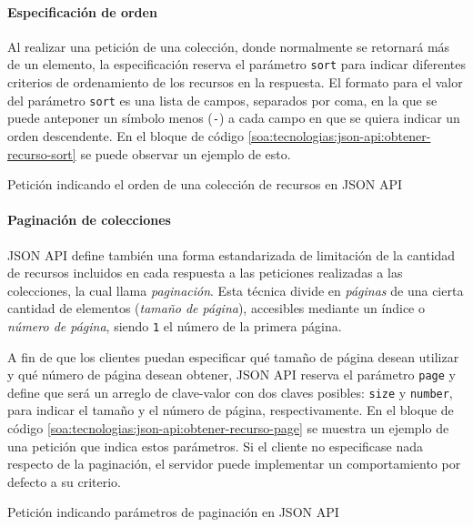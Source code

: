 \paragraph{Especificación de orden}

Al realizar una petición de una colección, donde normalmente se retornará más de un elemento, la especificación reserva el parámetro \texttt{sort} para indicar diferentes criterios de ordenamiento de los recursos en la respuesta. El formato para el valor del parámetro \texttt{sort} es una lista de campos, separados por coma, en la que se puede anteponer un símbolo menos (\texttt{-}) a cada campo en que se quiera indicar un orden descendente. En el bloque de código \autoref{soa:tecnologias:json-api:obtener-recurso-sort} se puede observar un ejemplo de esto.

\begin{listing}
  \caption{Petición indicando el orden de una colección de recursos en JSON API}
  \label{soa:tecnologias:json-api:obtener-recurso-sort}
\end{listing}

\paragraph{Paginación de colecciones}

JSON API define también una forma estandarizada de limitación de la cantidad de recursos incluidos en cada respuesta a las peticiones realizadas a las colecciones, la cual llama \textit{paginación}. Esta técnica divide en \textit{páginas} de una cierta cantidad de elementos (\textit{tamaño de página}), accesibles mediante un índice o \textit{número de página}, siendo \texttt{1} el número de la primera página.

A fin de que los clientes puedan especificar qué tamaño de página desean utilizar y qué número de página desean obtener, JSON API reserva el parámetro \texttt{page} y define que será un arreglo de clave-valor con dos claves posibles: \texttt{size} y \texttt{number}, para indicar el tamaño y el número de página, respectivamente. En el bloque de código \autoref{soa:tecnologias:json-api:obtener-recurso-page} se muestra un ejemplo de una petición que indica estos parámetros. Si el cliente no especificase nada respecto de la paginación, el servidor puede implementar un comportamiento por defecto a su criterio.

\begin{listing}
  \caption{Petición indicando parámetros de paginación en JSON API}
  \label{soa:tecnologias:json-api:obtener-recurso-page}
\end{listing}

